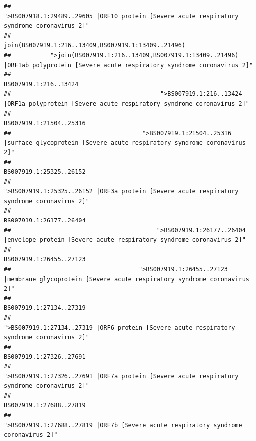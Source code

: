 \documentclass[
]{article}
\begin{document}
\begin{verbatim}
##                                            ">BS007918.1:29489..29605 |ORF10 protein [Severe acute respiratory syndrome coronavirus 2]" 
##                                                                                    join(BS007919.1:216..13409,BS007919.1:13409..21496) 
##           ">join(BS007919.1:216..13409,BS007919.1:13409..21496) |ORF1ab polyprotein [Severe acute respiratory syndrome coronavirus 2]" 
##                                                                                                                  BS007919.1:216..13424 
##                                          ">BS007919.1:216..13424 |ORF1a polyprotein [Severe acute respiratory syndrome coronavirus 2]" 
##                                                                                                                BS007919.1:21504..25316 
##                                     ">BS007919.1:21504..25316 |surface glycoprotein [Severe acute respiratory syndrome coronavirus 2]" 
##                                                                                                                BS007919.1:25325..26152 
##                                            ">BS007919.1:25325..26152 |ORF3a protein [Severe acute respiratory syndrome coronavirus 2]" 
##                                                                                                                BS007919.1:26177..26404 
##                                         ">BS007919.1:26177..26404 |envelope protein [Severe acute respiratory syndrome coronavirus 2]" 
##                                                                                                                BS007919.1:26455..27123 
##                                    ">BS007919.1:26455..27123 |membrane glycoprotein [Severe acute respiratory syndrome coronavirus 2]" 
##                                                                                                                BS007919.1:27134..27319 
##                                             ">BS007919.1:27134..27319 |ORF6 protein [Severe acute respiratory syndrome coronavirus 2]" 
##                                                                                                                BS007919.1:27326..27691 
##                                            ">BS007919.1:27326..27691 |ORF7a protein [Severe acute respiratory syndrome coronavirus 2]" 
##                                                                                                                BS007919.1:27688..27819 
##                                                    ">BS007919.1:27688..27819 |ORF7b [Severe acute respiratory syndrome coronavirus 2]" 

\end{verbatim}
\end{document}
